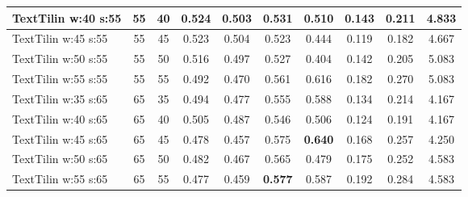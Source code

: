 \documentclass{article}
\begin{document}
\begin{longtable}[c]{|l|c|c|c|c|c|c|c|c|c|}
 TextTilin w:40 s:55 & 55 & 40 & 0.524 & 0.503 & 0.531 & 0.510 & 0.143 & 0.211 & 4.833  \\ \hline 
 TextTilin w:45 s:55 & 55 & 45 & 0.523 & 0.504 & 0.523 & 0.444 & 0.119 & 0.182 & 4.667  \\ \hline 
 TextTilin w:50 s:55 & 55 & 50 & 0.516 & 0.497 & 0.527 & 0.404 & 0.142 & 0.205 & 5.083  \\ \hline 
 TextTilin w:55 s:55 & 55 & 55 & 0.492 & 0.470 & 0.561 & 0.616 & 0.182 & 0.270 & 5.083  \\ \hline 
 TextTilin w:35 s:65 & 65 & 35 & 0.494 & 0.477 & 0.555 & 0.588 & 0.134 & 0.214 & 4.167  \\ \hline 
 TextTilin w:40 s:65 & 65 & 40 & 0.505 & 0.487 & 0.546 & 0.506 & 0.124 & 0.191 & 4.167  \\ \hline 
 TextTilin w:45 s:65 & 65 & 45 & 0.478 & 0.457 & 0.575 & \cellcolor{gray!20} \textbf{0.640} & 0.168 & 0.257 & 4.250  \\ \hline 
 TextTilin w:50 s:65 & 65 & 50 & 0.482 & 0.467 & 0.565 & 0.479 & 0.175 & 0.252 & 4.583  \\ \hline 
 TextTilin w:55 s:65 & 65 & 55 & 0.477 & 0.459 & \cellcolor{gray!20} \textbf{0.577} & 0.587 & 0.192 & 0.284 & 4.583  \\ \hline 
 \end{longtable} 
\end{document}
